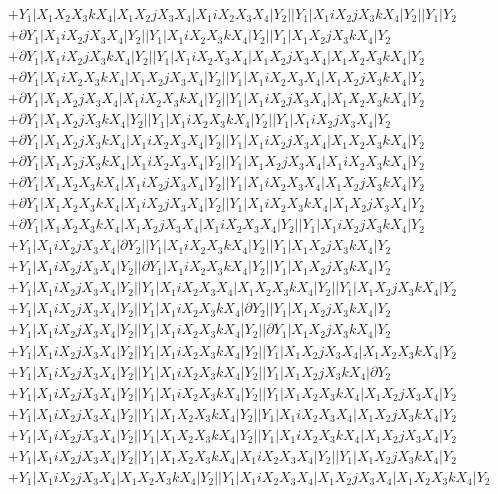 \documentclass{article}[12pt]
\begin{document}
\begin{align*}
 & + Y_1|X_1X_2X_3kX_4|X_1X_2jX_3X_4|X_1iX_2X_3X_4|Y_2||Y_1|X_1iX_2jX_3kX_4|Y_2||Y_1|Y_2\\ 
& + \partial Y_1|X_1iX_2jX_3X_4|Y_2||Y_1|X_1iX_2X_3kX_4|Y_2||Y_1|X_1X_2jX_3kX_4|Y_2\\ 
 & +\partial Y_1|X_1iX_2jX_3kX_4|Y_2||Y_1|X_1iX_2X_3X_4|X_1X_2jX_3X_4|X_1X_2X_3kX_4|Y_2\\ 
 & +\partial Y_1|X_1iX_2X_3kX_4|X_1X_2jX_3X_4|Y_2||Y_1|X_1iX_2X_3X_4|X_1X_2jX_3kX_4|Y_2\\ 
 & +\partial Y_1|X_1X_2jX_3X_4|X_1iX_2X_3kX_4|Y_2||Y_1|X_1iX_2jX_3X_4|X_1X_2X_3kX_4|Y_2\\ 
 & +\partial Y_1|X_1X_2jX_3kX_4|Y_2||Y_1|X_1iX_2X_3kX_4|Y_2||Y_1|X_1iX_2jX_3X_4|Y_2\\ 
 & +\partial Y_1|X_1X_2jX_3kX_4|X_1iX_2X_3X_4|Y_2||Y_1|X_1iX_2jX_3X_4|X_1X_2X_3kX_4|Y_2\\ 
 & +\partial Y_1|X_1X_2jX_3kX_4|X_1iX_2X_3X_4|Y_2||Y_1|X_1X_2jX_3X_4|X_1iX_2X_3kX_4|Y_2\\ 
 & +\partial Y_1|X_1X_2X_3kX_4|X_1iX_2jX_3X_4|Y_2||Y_1|X_1iX_2X_3X_4|X_1X_2jX_3kX_4|Y_2\\ 
 & +\partial Y_1|X_1X_2X_3kX_4|X_1iX_2jX_3X_4|Y_2||Y_1|X_1iX_2X_3kX_4|X_1X_2jX_3X_4|Y_2\\ 
 & +\partial Y_1|X_1X_2X_3kX_4|X_1X_2jX_3X_4|X_1iX_2X_3X_4|Y_2||Y_1|X_1iX_2jX_3kX_4|Y_2\\ 
 & +Y_1|X_1iX_2jX_3X_4|\partial Y_2||Y_1|X_1iX_2X_3kX_4|Y_2||Y_1|X_1X_2jX_3kX_4|Y_2\\ 
 & +Y_1|X_1iX_2jX_3X_4|Y_2||\partial Y_1|X_1iX_2X_3kX_4|Y_2||Y_1|X_1X_2jX_3kX_4|Y_2\\ 
 & +Y_1|X_1iX_2jX_3X_4|Y_2||Y_1|X_1iX_2X_3X_4|X_1X_2X_3kX_4|Y_2||Y_1|X_1X_2jX_3kX_4|Y_2\\ 
 & +Y_1|X_1iX_2jX_3X_4|Y_2||Y_1|X_1iX_2X_3kX_4|\partial Y_2||Y_1|X_1X_2jX_3kX_4|Y_2\\ 
 & +Y_1|X_1iX_2jX_3X_4|Y_2||Y_1|X_1iX_2X_3kX_4|Y_2||\partial Y_1|X_1X_2jX_3kX_4|Y_2\\ 
 & +Y_1|X_1iX_2jX_3X_4|Y_2||Y_1|X_1iX_2X_3kX_4|Y_2||Y_1|X_1X_2jX_3X_4|X_1X_2X_3kX_4|Y_2\\ 
 & +Y_1|X_1iX_2jX_3X_4|Y_2||Y_1|X_1iX_2X_3kX_4|Y_2||Y_1|X_1X_2jX_3kX_4|\partial Y_2\\ 
 & +Y_1|X_1iX_2jX_3X_4|Y_2||Y_1|X_1iX_2X_3kX_4|Y_2||Y_1|X_1X_2X_3kX_4|X_1X_2jX_3X_4|Y_2\\ 
 & +Y_1|X_1iX_2jX_3X_4|Y_2||Y_1|X_1X_2X_3kX_4|Y_2||Y_1|X_1iX_2X_3X_4|X_1X_2jX_3kX_4|Y_2\\ 
 & +Y_1|X_1iX_2jX_3X_4|Y_2||Y_1|X_1X_2X_3kX_4|Y_2||Y_1|X_1iX_2X_3kX_4|X_1X_2jX_3X_4|Y_2\\ 
 & +Y_1|X_1iX_2jX_3X_4|Y_2||Y_1|X_1X_2X_3kX_4|X_1iX_2X_3X_4|Y_2||Y_1|X_1X_2jX_3kX_4|Y_2\\ 
 & +Y_1|X_1iX_2jX_3X_4|X_1X_2X_3kX_4|Y_2||Y_1|X_1iX_2X_3X_4|X_1X_2jX_3X_4|X_1X_2X_3kX_4|Y_2\\ 
\end{align*}
\end{document}
